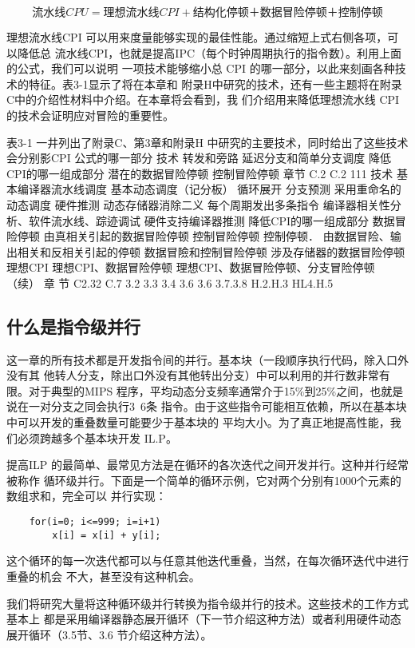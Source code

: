 \begin{equation}
    流水线 CPU=理想流水线 CPI+结构化停顿＋数据冒险停顿＋控制停顿
\end{equation}

理想流水线CPI 可以用来度量能够实现的最佳性能。通过缩短上式右侧各项，可以降低总
流水线CPI，也就是提高IPC（每个时钟周期执行的指令数）。利用上面的公式，我们可以说明
一项技术能够缩小总 CPI 的哪一部分，以此来刻画各种技术的特征。表3-1显示了将在本章和
附录H中研究的技术，还有一些主题将在附录C中的介绍性材料中介绍。在本章将会看到，我
们介绍用来降低理想流水线 CPI的技术会证明应对冒险的重要性。

表3-1 一井列出了附录C、第3章和附录H 中研究的主要技术，同时给出了这些技术会分别影CPI
公式的哪一部分
技术
转发和旁路
延迟分支和简单分支调度
降低CPI的哪一组成部分
潜在的数据冒险停顿
控制冒险停顿
章节
C.2
C.2
111
技术
基本编译器流水线调度
基本动态调度（记分板）
循环展开
分支预测
采用重命名的动态调度
硬件推测
动态存储器消除二义
每个周期发出多条指令
编译器相关性分析、软件流水线、踪迹调试
硬件支持编译器推测
降低CPI的哪一组成部分
数据冒险停顿
由真相关引起的数据冒险停顿
控制冒险停顿
控制停顿．
由数据冒险、输出相关和反相关引起的停顿
数据冒險和控制冒险停顿
涉及存储器的数据冒险停顿
理想CPI
理想CPI、数据冒险停顿
理想CPI、数据冒险停顿、分支冒险停顿
（续）
章
节
C2.32
C.7
3.2
3.3
3.4
3.6
3.6
3.7.3.8
H.2.H.3
HL4.H.5

\subsection{什么是指令级并行}
这一章的所有技术都是开发指令间的并行。基本块（一段顺序执行代码，除入口外没有其
他转人分支，除出口外没有其他转出分支）中可以利用的并行数非常有限。对于典型的MIPS
程序，平均动态分支频率通常介于15\%到25\%之间，也就是说在一对分支之同会执行3~6条
指令。由于这些指令可能相互依赖，所以在基本块中可以开发的重叠数量可能要少于基本块的
平均大小。为了真正地提高性能，我们必须跨越多个基本块开发 IL.P。

提高ILP 的最简单、最常见方法是在循环的各次迭代之间开发并行。这种并行经常被称作
循环级并行。下面是一个简单的循环示例，它对两个分别有1000个元素的数组求和，完全可以
并行实现：

\begin{verbatim}
    for(i=0; i<=999; i=i+1)
        x[i] = x[i] + y[i];
\end{verbatim}
这个循环的每一次迭代都可以与任意其他迭代重叠，当然，在每次循环迭代中进行重叠的机会
不大，甚至没有这种机会。

我们将研究大量将这种循环级并行转换为指令级并行的技术。这些技术的工作方式基本上
都是采用编译器静态展开循环（下一节介绍这种方法）或者利用硬件动态展开循环（3.5节、3.6
节介绍这种方法）。

